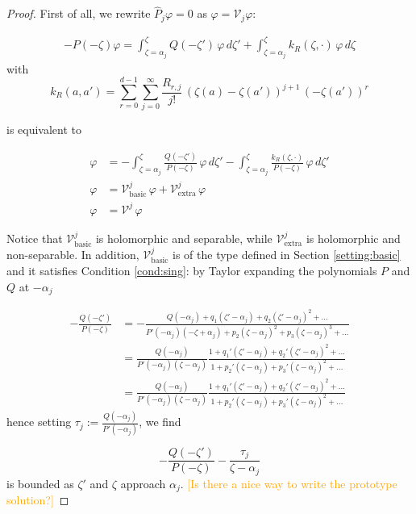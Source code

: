 \documentclass{article}
\theoremstyle{plain}
\newcommand{\volterra}{\mathcal{V}}
\newcommand{\hardpart}{\mathcal{V}_\text{basic}}
\newcommand{\softpart}{\mathcal{V}_\text{extra}}
\begin{document}
\begin{proof}
First of all, we rewrite $\hat{P}_j\varphi=0$ as $\varphi = \volterra_j \varphi $: %

\begin{align*}
    -P(-\zeta)\varphi= \int_{\zeta=\alpha_j}^\zeta Q(-\zeta')  \, \varphi \, d\zeta' + \int_{\zeta=\alpha_j}^\zeta k_R(\zeta,\cdot)  \, \varphi \, d\zeta
\end{align*}
with \[k_R(a,a')=\sum_{r=0}^{d-1}\sum_{j=0}^\infty \frac{R_{r,j}}{j!} \, (\zeta(a)-\zeta(a'))^{j+1} \, (-\zeta(a'))^r\]  

is equivalent to 

\begin{align}
   \nonumber \varphi& =-\int_{\zeta=\alpha_j}^\zeta \frac{Q(-\zeta')}{P(-\zeta)}  \, \varphi \, d\zeta' - \int_{\zeta=\alpha_j}^\zeta \frac{k_R(\zeta,\cdot)}{P(-\zeta)}  \, \varphi \, d\zeta' \\
   \nonumber \varphi& = \hardpart^j \, \varphi+ \softpart^j \, \varphi \\
   \varphi &= \volterra^j \, \varphi
\end{align}

Notice that $\hardpart^j$ is holomorphic and separable, while $\softpart^j$ is holomorphic and non-separable. In addition, $\hardpart^j$ is of the type defined in Section \ref{setting:basic} and it satisfies Condition \eqref{cond:sing}: by Taylor expanding the polynomials $P$ and $Q$ at $-\alpha_j$

\begin{align*}
    -\frac{Q(-\zeta')}{P(-\zeta)}&=-\frac{Q(-\alpha_j)+q_1(\zeta'-\alpha_j)+q_2 (\zeta'-\alpha_j)^2+...}{P'(-\alpha_j)(-\zeta+\alpha_j)+ p_2 (\zeta-\alpha_j)^2+p_3(\zeta-\alpha_j)^3+...}\\
    &=\frac{Q(-\alpha_j)}{P'(-\alpha_j)(\zeta-\alpha_j)}\frac{1+q_1'(\zeta'-\alpha_j)+q_2' (\zeta'-\alpha_j)^2+...}{1+ p_2' (\zeta-\alpha_j)+p_3'(\zeta-\alpha_j)^2+...}\\
    &=\frac{Q(-\alpha_j)}{P'(-\alpha_j)(\zeta-\alpha_j)}\frac{1+q_1'(\zeta'-\alpha_j)+q_2' (\zeta'-\alpha_j)^2+...}{1+p_2' (\zeta-\alpha_j)+p_3'(\zeta-\alpha_j)^2+...}
\end{align*}
hence setting $\tau_j:=\frac{Q(-\alpha_j)}{P'(-\alpha_j)}$, we find

\begin{equation*}
    -\frac{Q(-\zeta')}{P(-\zeta)}-\frac{\tau_j}{\zeta-\alpha_j}
\end{equation*}
is bounded as $\zeta'$ and $\zeta$ approach $\alpha_j$. \textcolor{orange}{[Is there a nice way to write the prototype solution?]} 


\end{proof}
\end{document}

